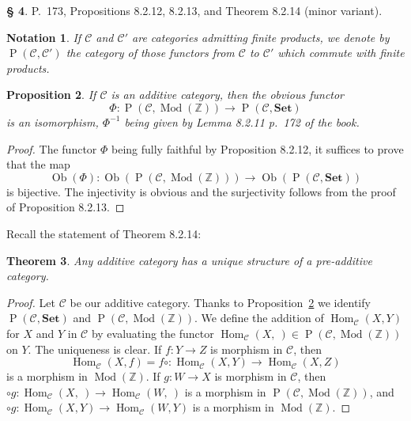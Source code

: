 \documentclass[12pt]{article}%
\newtheorem{thm}{Theorem}%
\newtheorem{prop}[thm]{Proposition}
\newtheorem{nota}[thm]{Notation}
\theoremstyle{remark}
\theoremstyle{definition}
\newtheorem{s}[thm]{\S}%
\newcommand{\oo}{\operatorname}
\newcommand{\C}{\mathcal C}
\newcommand{\Set}{\mathbf{Set}}
\DeclareMathOperator{\Hom}{Hom}%
\DeclareMathOperator{\Mod}{Mod}
\begin{document}
\begin{s}%
P.~173, Propositions 8.2.12, 8.2.13, and Theorem 8.2.14  (minor variant). 
\begin{nota}
If $\C$ and $\C'$ are categories admitting finite products, we denote by $\oo P(\C,\C')$ the category of those functors from $\C$ to $\C'$ which commute with finite products.
\end{nota}

\begin{prop}\label{8.2.12}
If $\C$ is an additive category, then the obvious functor 
$$
\Phi:\oo P(\C,\Mod(\mathbb Z))\to\oo P(\C,\Set)
$$ 
is an isomorphism, $\Phi^{-1}$ being given by Lemma 8.2.11 p.~172 of the book.
\end{prop}

\begin{proof}
The functor $\Phi$ being fully faithful by Proposition 8.2.12, it suffices to prove that the map 
$$
\oo{Ob}(\Phi):\oo{Ob}(\oo P(\C,\Mod(\mathbb Z)))\to\oo{Ob}(\oo P(\C,\Set))
$$ 
is bijective. The injectivity is obvious and the surjectivity follows from the proof of Proposition 8.2.13.
\end{proof}

Recall the statement of Theorem 8.2.14:
%
\begin{thm}
Any additive category has a unique structure of a pre-additive category.
\end{thm}
%
\begin{proof}
Let $\C$ be our additive category. Thanks to Proposition~\ref{8.2.12} we identify $\oo P(\C,\Set)$ and $\oo P(\C,\Mod(\mathbb Z))$. We define the addition of $\Hom_\C(X,Y)$ for $X$ and $Y$ in $\C$ by evaluating the functor $\Hom_\C(X,\ )\in\oo P(\C,\Mod(\mathbb Z))$ on $Y$. The uniqueness is clear. If $f:Y\to Z$ is morphism in $\C$, then 
$$
\Hom_\C(X,f)=f\circ:\Hom_\C(X,Y)\to\Hom_\C(X,Z)
$$ 
is a morphism in $\Mod(\mathbb Z)$. If $g:W\to X$ is morphism in $\C$, then $\circ g:\Hom_\C(X,\ )\to\Hom_\C(W,\ )$ is a morphism in $\oo P(\C,\Mod(\mathbb Z))$, and $\circ g:\Hom_\C(X,Y)\to\Hom_\C(W,Y)$ is a morphism in $\Mod(\mathbb Z)$.
\end{proof}
\end{s}

%
\end{document}
